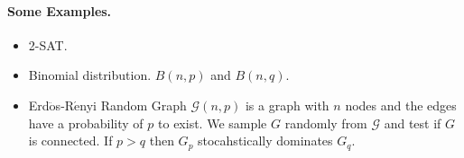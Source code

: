         \paragraph{Some Examples.}
        \begin{itemize}
            \item 2-SAT.
            \item Binomial distribution. $B(n,p)$ and $B(n,q)$.
            \item Erd$\mathrm{\ddot{o}}$s-R$\mathrm{\acute{e}}$nyi Random Graph $\mathcal{G}(n,p)$ is a graph with $n$ nodes and the edges have a probability of $p$ to exist. We sample $G$ randomly from $\mathcal{G}$ and test if $G$ is connected. If $p>q$ then $G_p$ stocahstically dominates $G_q$.
        \end{itemize}

